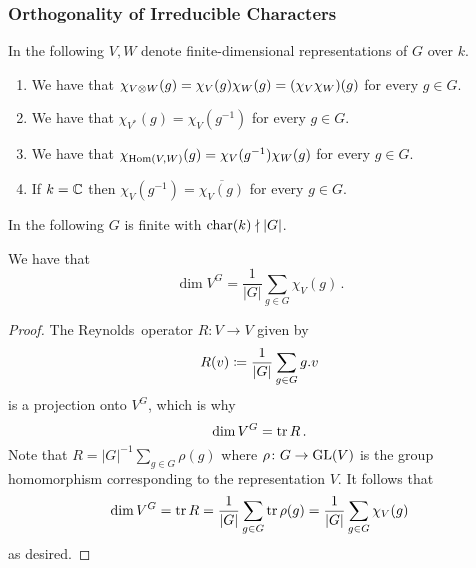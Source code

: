 \subsubsection{Orthogonality of Irreducible Characters}


\begin{conventions}
  In the following $V, W$ denote finite-dimensional representations of $G$ over $k$.
\end{conventions}

\begin{lemma}
  \label{lemma: more characters for groups}
  \leavevmode
  \begin{enumerate}
    \item
      We have that $\chi_{V \mathbin{\otimes} W}(g) = \chi_V(g) \chi_W(g) = (\chi_V \chi_W)(g)$ for every $g \in G$.
    \item
      We have that $\chi_{V^*}(g) = \chi_V(g^{-1})$ for every $g \in G$.
    \item
      We have that $\chi_{\operatorname{Hom}(V, W)}(g) = \chi_V(g^{-1}) \chi_W(g)$ for every $g \in G$.
    \item
      If $k = \mathbb{C}$ then $\chi_V(g^{-1}) = \overline{\chi_V(g)}$ for every $g \in G$.
  \end{enumerate}
\end{lemma}




\begin{conventions}
  In the following $G$ is finite with $\operatorname{char}(k) \nmid |G|$.
\end{conventions}


\begin{lemma}
  \label{lemma: dimension of invariants via character}
  We have that
  \[
      \dim V^G
    = \frac{1}{|G|} \sum_{g \in G} \chi_V(g) \,.
  \]
\end{lemma}


\begin{proof}
  The Reynolds~operator $R \colon V \to V$ given by
  \[
              R(v)
    \coloneqq  \frac{1}{|G|} \sum_{g \in G} g.v
  \]
  is a projection onto $V^G$, which is why
  \[
      \dim V^G
    = \operatorname{tr} R \,.
  \]
  Note that $R = |G|^{-1} \sum_{g \in G} \rho(g)$ where $\rho \colon G \to \operatorname{GL}(V)$ is the group homomorphism corresponding to the representation $V$.
  It follows that
  \[
      \dim V^G
    = \operatorname{tr} R
    = \frac{1}{|G|} \sum_{g \in G} \operatorname{tr} \rho(g)
    = \frac{1}{|G|} \sum_{g \in G} \chi_V(g)
  \]
  as desired.
\end{proof}


